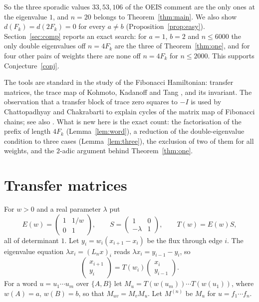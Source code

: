 \documentclass[11pt]{amsart}
\theoremstyle{definition}
\begin{document}
So the three sporadic values $33,53,106$ of the OEIS comment are the only ones at the eigenvalue $1$, and
$n=20$ belongs to Theorem~\ref{thm:main}. We also show $d(F_k)=d(2F_k)=0$ for every $a\ne b$
(Proposition~\ref{prop:easy}). Section~\ref{sec:comp} reports an exact search: for $a=1$, $b=2$ and
$n\le6000$ the only double eigenvalues off $n=4F_k$ are the three of Theorem~\ref{thm:one}, and for four other
pairs of weights there are none off $n=4F_k$ for $n\le2000$. This supports Conjecture~\ref{conj}.

The tools are standard in the study of the Fibonacci Hamiltonian: transfer matrices, the trace map of
Kohmoto, Kadanoff and Tang \cite{KKT}, and its invariant. The observation that a transfer block of trace
zero squares to $-I$ is used by Chattopadhyay and Chakrabarti \cite{CC} to explain cycles of the matrix map
of Fibonacci chains; see also \cite{KST}. What is new here is the exact count: the factorisation of the
prefix of length $4F_k$ (Lemma~\ref{lem:word}), a reduction of the double-eigenvalue condition to three cases
(Lemma~\ref{lem:three}), the exclusion of two of them for all weights, and the $2$-adic argument behind
Theorem~\ref{thm:one}.

\section{Transfer matrices}

For $w>0$ and a real parameter $\lambda$ put
\[
E(w)=\begin{pmatrix}1&1/w\\0&1\end{pmatrix},\qquad S=\begin{pmatrix}1&0\\-\lambda&1\end{pmatrix},\qquad
T(w)=E(w)S,
\]
all of determinant $1$. Let $y_i=w_i(x_{i+1}-x_i)$ be the flux through edge $i$. The eigenvalue equation
$\lambda x_i=(L_nx)_i$ reads $\lambda x_i=y_{i-1}-y_i$, so
\[
\begin{pmatrix}x_{i+1}\\y_i\end{pmatrix}=T(w_i)\begin{pmatrix}x_i\\y_{i-1}\end{pmatrix}.
\]
For a word $u=u_1\cdots u_m$ over $\{A,B\}$ let $M_u=T(w(u_m))\cdots T(w(u_1))$, where $w(A)=a$, $w(B)=b$, so
that $M_{uv}=M_vM_u$. Let $M^{(n)}$ be $M_u$ for $u=f_1\cdots f_n$.
\end{document}
